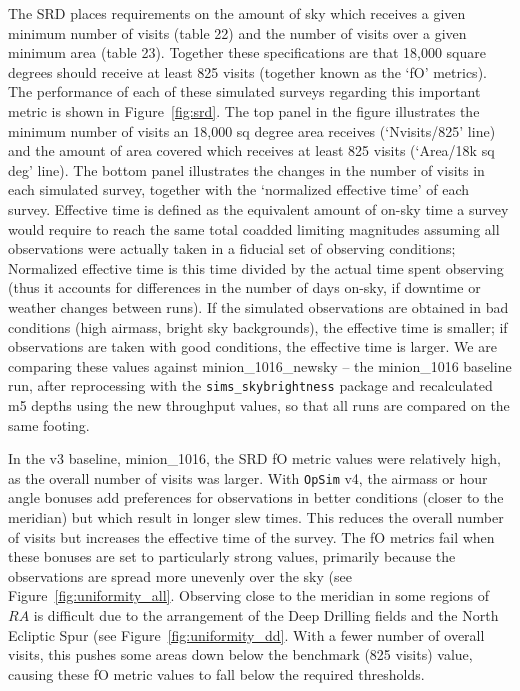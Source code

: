 \documentclass[DM,lsstdraft,authoryear,toc]{lsstdoc}
\newcommand{\opsim}{\texttt{OpSim}\xspace}
\newcommand{\simsky}{\texttt{sims\_skybrightness}\xspace}
\begin{document}
The SRD places requirements on the amount of sky which receives a given minimum number of visits (table 22) and the number of visits over a given minimum area (table 23). Together these specifications are that 18,000 square degrees should receive at least 825 visits (together known as the `fO' metrics). The performance of each of these simulated surveys regarding this important metric is shown in Figure~\ref{fig:srd}. The top panel in the figure illustrates the minimum number of visits an 18,000 sq degree area receives (`Nvisits/825' line) and the amount of area covered which receives at least 825 visits (`Area/18k sq deg' line).  The bottom panel illustrates the changes in the number of visits in each simulated survey, together with the `normalized effective time' of each survey. Effective time is defined as the equivalent amount of on-sky time a survey would require to reach the same total coadded limiting magnitudes assuming all observations were actually taken in a fiducial set of observing conditions; Normalized effective time is this time divided by the actual time spent observing (thus it accounts for differences in the number of days on-sky, if downtime or weather changes between runs). If the simulated observations are obtained in bad conditions (high airmass, bright sky backgrounds), the effective time is smaller; if observations are taken with good conditions, the effective time is larger. We are comparing these values against minion\_1016\_newsky -- the minion\_1016 baseline run, after reprocessing with the \simsky package and recalculated m5 depths using the new throughput values, so that all runs are compared on the same footing.

In the v3 baseline, minion\_1016, the SRD fO metric values were relatively high, as the overall number of visits was larger. With \opsim v4, the airmass or hour angle bonuses add preferences for observations in better conditions (closer to the meridian) but which result in longer slew times. This reduces the overall number of visits but increases the effective time of the survey. The fO metrics fail when these bonuses are set to particularly strong values, primarily because the observations are spread more unevenly over the sky (see Figure~\ref{fig:uniformity_all}.  Observing close to the meridian in some regions of $RA$ is difficult due to the arrangement of the Deep Drilling fields and the North Ecliptic Spur (see Figure~\ref{fig:uniformity_dd}. With a fewer number of overall visits, this pushes some areas down below the benchmark (825 visits) value, causing these fO metric values to fall below the required thresholds.
\end{document}
